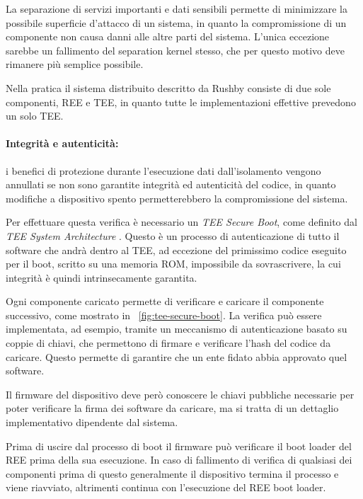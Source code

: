 \documentclass[12pt,italian]{report}
\begin{document}
	La separazione di servizi importanti e dati sensibili permette di minimizzare la possibile superficie d'attacco di un sistema, in quanto la compromissione di un componente non causa danni alle altre parti del sistema. L'unica eccezione sarebbe un fallimento del separation kernel stesso, che per questo motivo deve rimanere più semplice possibile. 
	
	Nella pratica il sistema distribuito descritto da Rushby consiste di due sole componenti, REE e TEE, in quanto tutte le implementazioni effettive prevedono un solo TEE.
	
	\newpage
	
	\paragraph{Integrità e autenticità:} i benefici di protezione durante l'esecuzione dati dall'isolamento vengono annullati se non sono garantite integrità ed autenticità del codice, in quanto modifiche a dispositivo spento permetterebbero la compromissione del sistema.
	
	\bigbreak
	
	Per effettuare questa verifica è necessario un \textit{TEE Secure Boot}, come definito dal \textit{TEE System Architecture} \cite{gp2020systemarchitecture}. Questo è un processo di autenticazione di tutto il software che andrà dentro al TEE, ad eccezione del primissimo codice eseguito per il boot, scritto su una memoria ROM, impossibile da sovrascrivere, la cui integrità è quindi intrinsecamente garantita.
	
	\bigbreak
	
	Ogni componente caricato permette di verificare e caricare il componente successivo, come mostrato in \figurename~\ref{fig:tee-secure-boot}. La verifica può essere implementata, ad esempio, tramite un meccanismo di autenticazione basato su coppie di chiavi, che permettono di firmare e verificare l'hash del codice da caricare. Questo permette di garantire che un ente fidato abbia approvato quel software.
	
	Il firmware del dispositivo deve però conoscere le chiavi pubbliche necessarie per poter verificare la firma dei software da caricare, ma si tratta di un dettaglio implementativo dipendente dal sistema.
	
	\bigbreak
	
	Prima di uscire dal processo di boot il firmware può verificare il boot loader del REE prima della sua esecuzione. In caso di fallimento di verifica di qualsiasi dei componenti prima di questo generalmente il dispositivo termina il processo e viene riavviato, altrimenti continua con l'esecuzione del REE boot loader.
	
\end{document}
